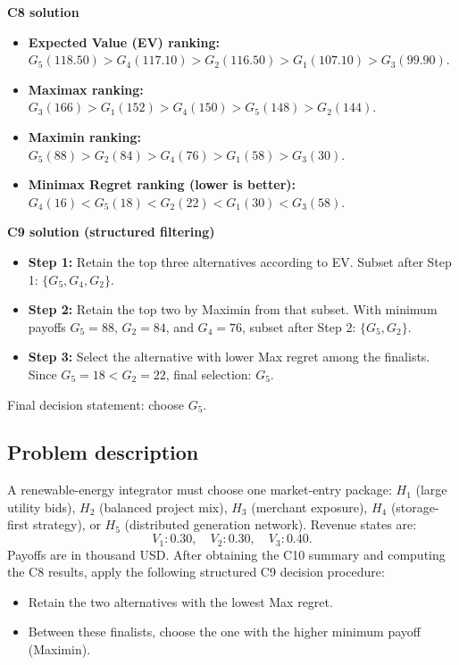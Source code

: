 \begin{ExamProblems}
		\textbf{C8 solution}
		\begin{itemize}
			\item \textbf{Expected Value (EV) ranking:} $G_5(118.50)>G_4(117.10)>G_2(116.50)>G_1(107.10)>G_3(99.90)$.
			\item \textbf{Maximax ranking:} $G_3(166)>G_1(152)>G_4(150)>G_5(148)>G_2(144)$.
			\item \textbf{Maximin ranking:} $G_5(88)>G_2(84)>G_4(76)>G_1(58)>G_3(30)$.
			\item \textbf{Minimax Regret ranking (lower is better):} $G_4(16)<G_5(18)<G_2(22)<G_1(30)<G_3(58)$.
		\end{itemize}

		\textbf{C9 solution (structured filtering)}
		\begin{itemize}
			\item \textbf{Step 1:} Retain the top three alternatives according to EV. Subset after Step 1: $\{G_5,G_4,G_2\}$.
			\item \textbf{Step 2:} Retain the top two by Maximin from that subset. With minimum payoffs $G_5=88$, $G_2=84$, and $G_4=76$, subset after Step 2: $\{G_5,G_2\}$.
			\item \textbf{Step 3:} Select the alternative with lower Max regret among the finalists. Since $G_5=18<G_2=22$, final selection: $G_5$.
		\end{itemize}
		Final decision statement: choose $G_5$.

		\newpage
		\item
		\subsection*{Problem description}
		A renewable-energy integrator must choose one market-entry package:
		$H_1$ (large utility bids), $H_2$ (balanced project mix), $H_3$ (merchant exposure), $H_4$ (storage-first strategy), or $H_5$ (distributed generation network).
		Revenue states are:
		\[
		V_1:0.30,\quad V_2:0.30,\quad V_3:0.40.
		\]
		Payoffs are in thousand USD.
		After obtaining the C10 summary and computing the C8 results, apply the following structured C9 decision procedure:
		\begin{itemize}
			\item Retain the two alternatives with the lowest Max regret.
			\item Between these finalists, choose the one with the higher minimum payoff (Maximin).
		\end{itemize}


\end{ExamProblems}
